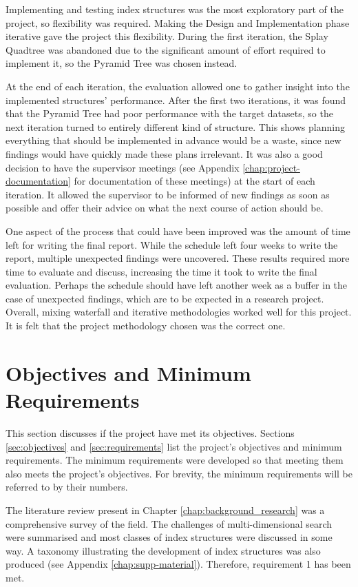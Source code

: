 Implementing and testing index structures was the most exploratory part of the project, so flexibility was required. Making the Design and Implementation phase iterative gave the project this flexibility. During the first iteration, the Splay Quadtree was abandoned due to the significant amount of effort required to implement it, so the Pyramid Tree was chosen instead.

At the end of each iteration, the evaluation allowed one to gather insight into the implemented structures' performance.  After the first two iterations, it was found that the Pyramid Tree had poor performance with the target datasets, so the next iteration turned to entirely different kind of structure. This shows planning everything that should be implemented in advance would be a waste, since new findings would have quickly made these plans irrelevant. It  was also a good decision to have the supervisor meetings (see Appendix \ref{chap:project-documentation} for documentation of these meetings) at the start of each iteration. It allowed the supervisor to be informed of new findings as soon as possible and offer their advice on what the next course of action should be.

One aspect of the process that could have been improved was the amount of time left for writing the final report. While the schedule left four weeks to write the report, multiple unexpected findings were uncovered. These results required more time to evaluate and discuss, increasing the time it took to write the final evaluation. Perhaps the schedule should have left another week as a buffer in the case of unexpected findings, which are to be expected in a research project. Overall, mixing waterfall and iterative methodologies worked well for this project. It is felt that the project methodology chosen was the correct one.

\section{Objectives and Minimum Requirements}

This section discusses if the project have met its objectives. Sections \ref{sec:objectives} and \ref{sec:requirements} list the project's objectives and minimum requirements. The minimum requirements were developed so that meeting them also meets the project's objectives. For brevity, the minimum requirements will be referred to by their numbers.

The literature review present in Chapter \ref{chap:background_research} was a comprehensive survey of the field. The challenges of multi-dimensional search were summarised and most classes of index structures were discussed in some way. A taxonomy illustrating the development of index structures was also produced (see Appendix \ref{chap:supp-material}). Therefore, requirement 1 has been met.

